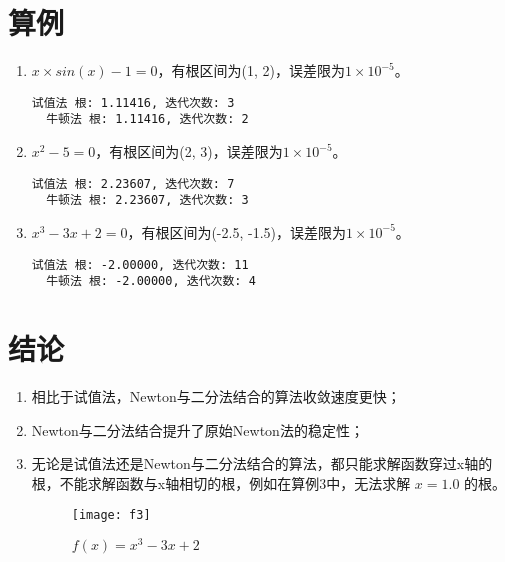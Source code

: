 \section{算例}

\begin{enumerate}
  \item $x\times sin(x) - 1 = 0$，有根区间为(1, 2)，误差限为$1\times 10^{-5}$。

  \begin{lstlisting}[style = python]
  试值法 根: 1.11416, 迭代次数: 3
  牛顿法 根: 1.11416, 迭代次数: 2
  \end{lstlisting}
  
  \item $x^2 - 5 = 0$，有根区间为(2, 3)，误差限为$1\times 10^{-5}$。

  \begin{lstlisting}[style = python]
  试值法 根: 2.23607, 迭代次数: 7
  牛顿法 根: 2.23607, 迭代次数: 3
  \end{lstlisting}

  \item $x^3 -3x + 2 = 0$，有根区间为(-2.5, -1.5)，误差限为$1\times 10^{-5}$。

  \begin{lstlisting}[style = python]
  试值法 根: -2.00000, 迭代次数: 11
  牛顿法 根: -2.00000, 迭代次数: 4
  \end{lstlisting}

\end{enumerate}

\section{结论}

\begin{enumerate}
  \item 相比于试值法，Newton与二分法结合的算法收敛速度更快；

  \item Newton与二分法结合提升了原始Newton法的稳定性；

  \item 无论是试值法还是Newton与二分法结合的算法，都只能求解函数穿过x轴的根，不能求解函数与x轴相切的根，例如在算例3中，无法求解 $x = 1.0$ 的根。

  \begin{figure}[ht]
  \centering
    \texttt{[image: f3]}
    \caption{$f(x) = x^3 -3x + 2$}
    \label{fig:f3}
  \end{figure}

\end{enumerate}

